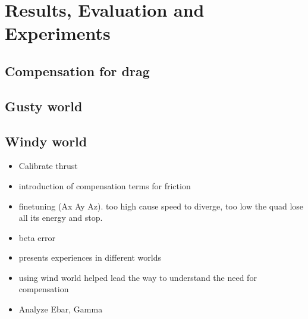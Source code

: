 \section{Results, Evaluation and Experiments}
\subsection{ Compensation for drag }

\subsection{ Gusty world }

\subsection{ Windy world }


 \begin{itemize}
    \item Calibrate thrust
    \item  introduction of compensation terms for friction
    \item finetuning (Ax Ay Az). too high cause speed to diverge, too low the quad lose all its energy and stop. 
    \item beta error
    \item presents experiences in different worlds
    \item using wind world helped lead the way to understand the need for compensation
    \item Analyze Ebar, Gamma
 \end{itemize}
